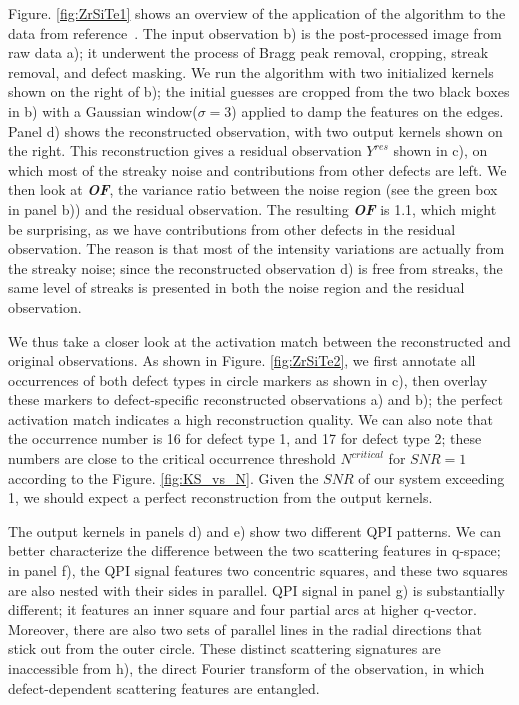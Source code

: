 Figure. \ref{fig:ZrSiTe1} shows an overview of the application of the algorithm to the data from reference~\cite{stuartQuasiparticleInterferenceObservation2022}. The input observation b) is the post-processed image from raw data a); it underwent the process of Bragg peak removal, cropping, streak removal, and defect masking. We run the algorithm with two initialized kernels shown on the right of b); the initial guesses are cropped from the two black boxes in b) with a Gaussian window($\sigma = 3$) applied to damp the features on the edges. Panel d) shows the reconstructed observation, with two output kernels shown on the right. This reconstruction gives a residual observation $Y^{res}$ shown in c), on which most of the streaky noise and contributions from other defects are left. We then look at \textbf{\textit{OF}}, the variance ratio between the noise region (see the green box in panel b)) and the residual observation. The resulting \textbf{\textit{OF}} is 1.1, which might be surprising, as we have contributions from other defects in the residual observation. The reason is that most of the intensity variations are actually from the streaky noise; since the reconstructed observation d) is free from streaks, the same level of streaks is presented in both the noise region and the residual observation. 

We thus take a closer look at the activation match between the reconstructed and original observations. As shown in Figure. \ref{fig:ZrSiTe2}, we first annotate all occurrences of both defect types in circle markers as shown in c), then overlay these markers to defect-specific reconstructed observations a) and b); the perfect activation match indicates a high reconstruction quality. We can also note that the occurrence number is 16 for defect type 1, and 17 for defect type 2; these numbers are close to the critical occurrence threshold $N^{critical}$ for $SNR=1$ according to the Figure. \ref{fig:KS_vs_N}. Given the $SNR$ of our system exceeding 1, we should expect a perfect reconstruction from the output kernels.

The output kernels in panels d) and e) show two different QPI patterns. We can better characterize the difference between the two scattering features in q-space; in panel f), the QPI signal features two concentric squares, and these two squares are also nested with their sides in parallel. QPI signal in panel g) is substantially different; it features an inner square and four partial arcs at higher q-vector. Moreover, there are also two sets of parallel lines in the radial directions that stick out from the outer circle. These distinct scattering signatures are inaccessible from h), the direct Fourier transform of the observation, in which defect-dependent scattering features are entangled.

